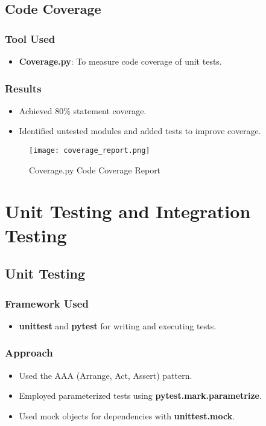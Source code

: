 \documentclass[12pt,a4paper]{report}
\begin{document}
\section{Code Coverage}
\subsection{Tool Used}
\begin{itemize}
    \item \textbf{Coverage.py}: To measure code coverage of unit tests.
\end{itemize}

\subsection{Results}
\begin{itemize}
    \item Achieved 80\% statement coverage.
    \item Identified untested modules and added tests to improve coverage.
\end{itemize}

\begin{figure}[H]
\centering
\texttt{[image: coverage\_report.png]}
\caption{Coverage.py Code Coverage Report}
\end{figure}

\chapter{Unit Testing and Integration Testing}
\section{Unit Testing}
\subsection{Framework Used}
\begin{itemize}
    \item \textbf{unittest} and \textbf{pytest} for writing and executing tests.
\end{itemize}

\subsection{Approach}
\begin{itemize}
    \item Used the AAA (Arrange, Act, Assert) pattern.
    \item Employed parameterized tests using \textbf{pytest.mark.parametrize}.
    \item Used mock objects for dependencies with \textbf{unittest.mock}.
\end{itemize}
\end{document}
